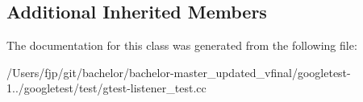 \subsection*{Additional Inherited Members}


The documentation for this class was generated from the following file\+:\begin{DoxyCompactItemize}
\item 
/\+Users/fjp/git/bachelor/bachelor-\/master\+\_\+updated\+\_\+vfinal/googletest-\/1../googletest/test/gtest-\/listener\+\_\+test.\+cc\end{DoxyCompactItemize}
